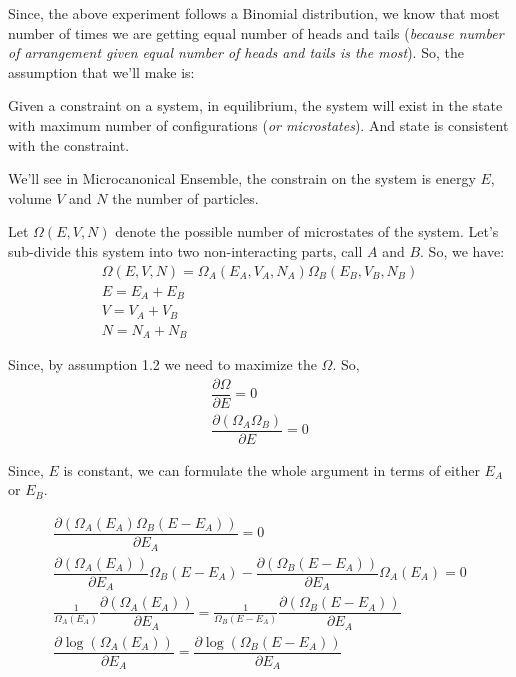 \documentclass{tufte-handout}
\begin{document}
Since, the above experiment follows a Binomial distribution, we know that most number of 
times we are getting equal number of heads and tails (\textit{because number of arrangement given 
equal number of heads and tails is the most}). So, the assumption that we'll make is:
\begin{assume}
	Given a constraint on a system, in equilibrium, the system will exist in the state with maximum 
	number of configurations (\textit{or microstates}). And state is consistent with the constraint. 
\end{assume}

We'll see in Microcanonical Ensemble, the constrain on the system is energy \(E\), volume \(V\) and \(N\) the 
number of particles. 

Let \(\Omega(E, V, N)\) denote the possible number of microstates of the system. Let's sub-divide this 
system into two non-interacting parts, call \(A\) and \(B\). So, we have:
\[\begin{gathered}
	\Omega(E, V, N) = \Omega_A(E_A, V_A, N_A)\Omega_B(E_B, V_B, N_B)\\
	E = E_A + E_B\\
	V = V_A + V_B\\
	N = N_A + N_B
\end{gathered}\]

Since, by assumption 1.2 we need to maximize the \(\Omega\). So, 
\[\begin{gathered}
	\dfrac{\partial \Omega}{\partial E} = 0\\
	\dfrac{\partial (\Omega_A \Omega_B)}{\partial E} = 0
\end{gathered}\]

Since, \(E\) is constant, we can formulate the whole argument in terms of either \(E_A\) or \(E_B\). 

\[\begin{gathered}
	\dfrac{\partial (\Omega_A(E_A) \Omega_B(E - E_A))}{\partial E_A} = 0\\
	\dfrac{\partial (\Omega_A(E_A))}{\partial E_A}\Omega_B(E - E_A) -
	\dfrac{\partial (\Omega_B(E - E_A))}{\partial E_A}\Omega_A(E_A) = 0\\
	\frac{1}{\Omega_A(E_A)}\dfrac{\partial (\Omega_A(E_A))}{\partial E_A} = 
	\frac{1}{\Omega_B(E - E_A)}\dfrac{\partial (\Omega_B(E - E_A))}{\partial E_A}\\
	\dfrac{\partial \log(\Omega_A(E_A))}{\partial E_A} = \dfrac{\partial 
	\log(\Omega_B(E - E_A))}{\partial E_A}
\end{gathered}\]
\end{document}
